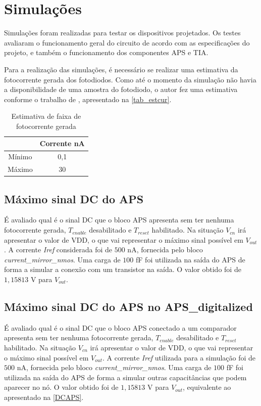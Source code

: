 \section{Simulações}

Simulações foram realizadas para testar os dispositivos projetados. Os testes avaliaram o funcionamento geral do circuito de acordo com as especificações do projeto, e também o funcionamento dos componentes APS e TIA.

Para a realização das simulações, é necessário se realizar uma estimativa da fotocorrente gerada dos fotodiodos. Como até o momento da simulação não havia a disponibilidade de uma amostra do fotodiodo, o autor fez uma estimativa conforme o trabalho de \cite{LidianeCampos}, apresentado na \autoref{tab_estcur}.

\begin{table}[htbp]
\caption{Estimativa de faixa de fotocorrente gerada}
\label{tab_estcur}
\centering
\begin{tabular}{cc}
\toprule
& Corrente nA \\
\midrule \midrule
Mínimo & 0,1\\
\midrule
Máximo & 30\\
\bottomrule
\end{tabular}
\end{table}

\subsection{Máximo sinal DC do APS}
\label{DCAPS}

É avaliado qual é o sinal DC que o bloco APS apresenta sem ter nenhuma fotocorrente gerada, $T_{enable}$ desabilitado e $T_{reset}$ habilitado. Na situação $V_{cn}$ irá apresentar o valor de VDD, o que vai representar o máximo sinal possível em $V_{out}$. A corrente \textit{Iref} considerada foi de $500$ nA, fornecida pelo bloco \textit{current\_mirror\_nmos}. Uma carga de $100$ fF foi utilizada na saída do APS de forma a simular a conexão com  um transistor na saída. O valor obtido foi de $1,15813$ V para $V_{out}$.

\subsection{Máximo sinal DC do APS no APS\_digitalized}

É avaliado qual é o sinal DC que o bloco APS conectado a um comparador apresenta sem ter nenhuma fotocorrente gerada, $T_{enable}$ desabilitado e $T_{reset}$ habilitado. Na situação $V_{cn}$ irá apresentar o valor de VDD, o que vai representar o máximo sinal possível em $V_{out}$. A corrente \textit{Iref} utilizada para a simulação foi de $500$ nA, fornecida pelo bloco \textit{current\_mirror\_nmos}. Uma carga de $100$ fF foi utilizada na saída do APS de forma a simular outras capacitâncias que podem aparecer no nó. O valor obtido foi de $1,15813$ V para $V_{out}$, equivalente ao apresentado na \autoref{DCAPS}.

